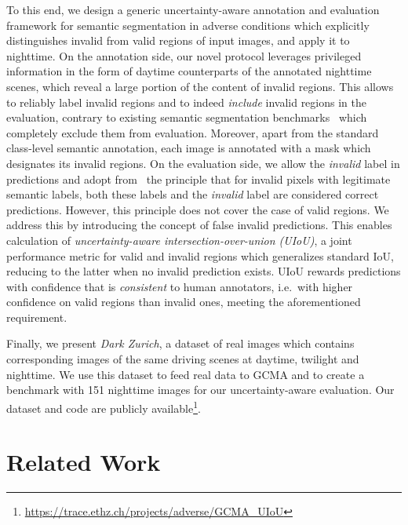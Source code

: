 \documentclass[10pt,twocolumn,letterpaper]{article}
\begin{document}
To this end, we design a generic uncertainty-aware annotation and evaluation framework for semantic segmentation in adverse conditions which explicitly distinguishes invalid from valid regions of input images, and apply it to nighttime. On the annotation side, our novel protocol leverages privileged information in the form of daytime counterparts of the annotated nighttime scenes, which reveal a large portion of the content of invalid regions. This allows to reliably label invalid regions and to indeed \emph{include} invalid regions in the evaluation, contrary to existing semantic segmentation benchmarks~\cite{Cityscapes} which completely exclude them from evaluation. Moreover, apart from the standard class-level semantic annotation, each image is annotated with a mask which designates its invalid regions. On the evaluation side, we allow the \emph{invalid} label in predictions and adopt from~\cite{wilddash} the principle that for invalid pixels with legitimate semantic labels, both these labels and the \emph{invalid} label are considered correct predictions. However, this principle does not cover the case of valid regions. We address this by introducing the concept of false invalid predictions. This enables calculation of \emph{uncertainty-aware intersection-over-union (UIoU)}, a joint performance metric for valid and invalid regions which generalizes standard IoU, reducing to the latter when no invalid prediction exists. UIoU rewards predictions with confidence that is \emph{consistent} to human annotators, i.e.\ with higher confidence on valid regions than invalid ones, meeting the aforementioned requirement.

Finally, we present \emph{Dark Zurich}, a dataset of real images which contains corresponding images of the same driving scenes at daytime, twilight and nighttime. We use this dataset to feed real data to GCMA and to create a benchmark with 151 nighttime images for our uncertainty-aware evaluation. Our dataset and code are publicly available\footnote{\scriptsize{\url{https://trace.ethz.ch/projects/adverse/GCMA_UIoU}}}.


\section{Related Work} 
\label{sec:related} 
\end{document}
